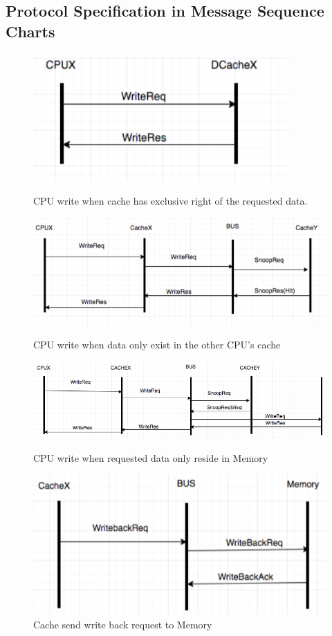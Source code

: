 \documentclass[12pt,frontmatter,copyright,thesis]{usfmanus}
\begin{document}
\begin{appendix}
\section{Protocol Specification in Message Sequence Charts}
\begin{figure}[h!] 
\centering
 \includegraphics[width=2In]{y1.png}
  \caption{\footnotesize CPU write when cache has exclusive right of the requested data. }
 \label{y1}
 \centering
 \includegraphics[width=3.6In]{y2.png}
 \caption{\footnotesize CPU write when data only exist in the other CPU's cache }
 \label{y2}
 \centering
 \includegraphics[width=5In]{y3.png}
 \caption{\footnotesize CPU write when requested data only reside in Memory }
 \label{y3}
 \centering
 \includegraphics[width=2.8In]{y4.png}
 \caption{\footnotesize Cache send write back request to Memory}
 \label{y4}
\end{figure}


\end{appendix}
\end{document}
